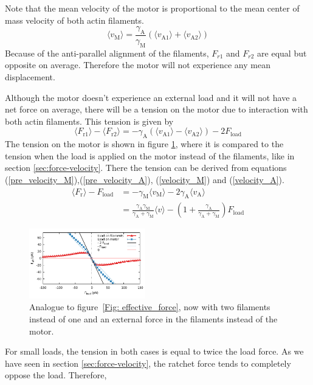 \documentclass[aps,pre,twocolumn,showpacs,showkeys]{revtex4-1}
\begin{document}
Note that the mean velocity of the motor is proportional to the mean center of mass velocity of both actin filaments. 
\begin{equation}
\langle v_\text{M} \rangle = \frac{\gamma_\text{A}}{\gamma_\text{M}} \left(\langle v_\text{A1} \rangle + \langle v_\text{A2} \rangle \right) \label{tug_F_motor} \nonumber
\end{equation}
Because of the anti-parallel alignment of the filaments, $F_{r1}$ and $F_{r2}$ are equal but opposite on average. 
Therefore the motor will not experience any mean displacement.  

Although the motor doesn't experience an external load and it will not have a net force on average, there will be a tension on the motor due to interaction with both actin filaments. This tension is given by
\begin{equation}
\langle F_\text{r1}\rangle - \langle F_\text{r2}\rangle = -\gamma_\text{A}\left(\langle v_\text{A1}\rangle - \langle v_\text{A2}\rangle \right) - 2F_\text{load} \nonumber
\end{equation}
The tension on the motor is shown in figure \ref{Fig: tug_F}, where it is compared to the tension when the load is applied on the motor instead of the filaments, like in section \ref{sec:force-velocity}. There the tension can be derived from equations (\ref{pre_velocity_M}),(\ref{pre_velocity_A}), (\ref{velocity_M}) and (\ref{velocity_A}).
\begin{align}
\langle F_\text{r} \rangle - F_\text{load} &= - \gamma_\text{M} \langle v_\text{M} \rangle - 2\gamma_\text{A} \langle v_\text{A} \rangle \nonumber\\
 &= \frac{\gamma_\text{A}\gamma_\text{M}}{\gamma_\text{A}+\gamma_\text{M}}\langle v\rangle - \left(1 + \frac{\gamma_\text{A}}{\gamma_\text{A}+\gamma_\text{M}} \right) F_\text{load} \nonumber
\end{align}
\begin{figure}[t]
\centering
\includegraphics[width=0.45\textwidth,height=!]{tug_F}
\caption{Analogue to figure~\ref{Fig: effective_force}, now with two filaments instead of one and an external force in the filaments instead of the motor.}
\label{Fig: tug_F}
\end{figure}
For small loads, the tension in both cases is equal to twice the load force. As we have seen in section \ref{sec:force-velocity}, the ratchet force tends to completely oppose the load. Therefore,  
\end{document}
